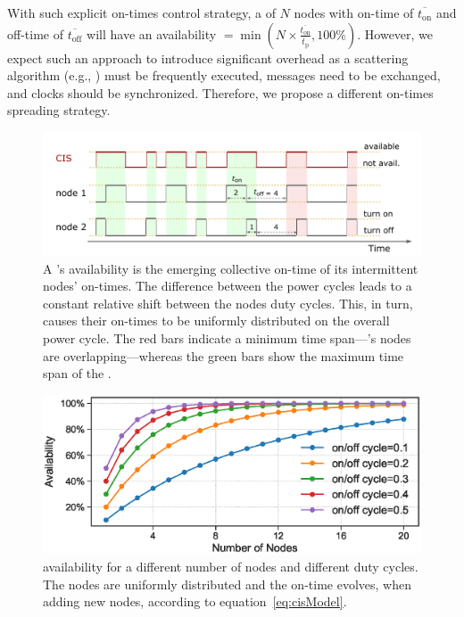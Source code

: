 With such explicit on-times control strategy, a \cis of $N$ nodes with on-time of $\overline{t_\text{on}}$ and off-time of $\overline{t_\text{off}}$ will have an availability 
$= \min \left(N\times \frac{\overline{t_\text{on}}}{\overline{t_\text{p}}}, 100\%\right)$. However, we expect such an approach to introduce significant overhead as a scattering algorithm (e.g., \cite{giusti2007decentralized}) must be frequently executed, messages need to be exchanged, and clocks should be synchronized. Therefore, we propose a different on-times spreading strategy.  
%
\begin{figure}[t]
		\centering
		\includegraphics[width=\columnwidth]{figures/cisOntime}
		\caption{A \fullcis's availability is the emerging collective on-time of its intermittent nodes' on-times. The difference between the power cycles leads to a constant relative shift between the nodes duty cycles. This, in turn, causes their on-times to be uniformly distributed on the overall power cycle. The red bars indicate a minimum \cis time span---\cis's nodes are overlapping---whereas the green bars show the maximum time span of the \cis.}
		\label{fig:cisOntime}
\end{figure} 
%
\begin{figure}
		\centering
		\includegraphics[width=\columnwidth]{figures/cisModel_2}
		\caption{\fullcis availability for a different number of nodes and different duty cycles. The nodes are uniformly distributed and the \cis on-time evolves, when adding new nodes, according to equation~\ref{eq:cisModel}.}
		\label{fig:cisModel}
\end{figure} 
%
